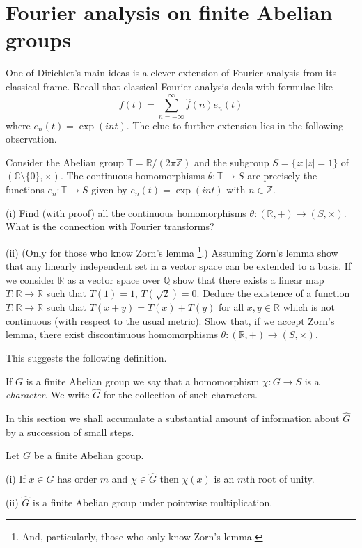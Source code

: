 \section{Fourier analysis on finite Abelian groups} One
of Dirichlet's main ideas is a clever extension of 
Fourier analysis from its classical frame. Recall
that classical Fourier analysis deals with formulae
like
\[f(t)=\sum_{n=-\infty}^{\infty}\hat{f}(n)e_{n}(t)\]
where $e_{n}(t)=\exp(int)$. The clue to further extension
lies in the following observation.
\begin{lemma} Consider the Abelian group 
${\mathbb T}={\mathbb R}/(2\pi{\mathbb Z})$ and the
subgroup $S=\{z:|z|=1\}$ of $({\mathbb C}\setminus\{0\},\times)$.
The continuous homomorphisms 
$\theta:{\mathbb T}\rightarrow S$ are precisely
the functions $e_{n}:{\mathbb T}\rightarrow S$ given
by $e_{n}(t)=\exp(int)$ with $n\in{\mathbb Z}$.
\end{lemma}
\begin{exercise} (i) Find (with proof) all the
continuous homomorphisms 
$\theta:({\mathbb R},+)\rightarrow (S,\times)$.
What is the connection with Fourier transforms?

(ii) (Only for those who know Zorn's lemma%
\footnote{And, particularly, those who only know Zorn's lemma.}.)
Assuming Zorn's lemma show that any linearly independent
set in a vector space can be extended
to a basis. If we consider ${\mathbb R}$ as a vector
space over ${\mathbb Q}$ show that there exists
a linear map $T:{\mathbb R}\rightarrow{\mathbb R}$ such
that $T(1)=1$, $T(\surd 2)=0$. Deduce the existence
of a function $T:{\mathbb R}\rightarrow{\mathbb R}$
such that $T(x+y)=T(x)+T(y)$ for all $x,y\in {\mathbb R}$
which is not continuous (with respect to the usual metric).
Show that, if we accept Zorn's lemma, there exist
discontinuous homomorphisms
$\theta:({\mathbb R},+)\rightarrow (S,\times)$.
\end{exercise}

This suggests the following definition.
\begin{definition} If $G$ is a finite Abelian group
we say that a homomorphism $\chi:G\rightarrow S$
is a \emph{character}. We write $\hat{G}$ for the
collection of such characters.
\end{definition}
In this section we shall accumulate a
substantial amount of information about $\hat{G}$
by a succession of small steps.

\begin{lemma} Let $G$ be a finite Abelian group.

(i) If $x\in G$ has order $m$ and $\chi\in\hat{G}$
then $\chi(x)$ is an $m$th root of unity.

(ii) $\hat{G}$ is a finite Abelian group under
pointwise multiplication. 
\end{lemma}

